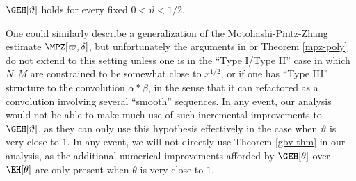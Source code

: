 \begin{theorem}\label{gbv-thm}\cite{motohashi}  $\GEH[\vartheta]$ holds for every fixed $0 < \vartheta < 1/2$.
\end{theorem}

One could similarly describe a generalization of the Motohashi-Pintz-Zhang estimate $\MPZ[\varpi,\delta]$, but unfortunately the arguments in \cite{zhang} or Theorem \ref{mpz-poly} do not extend to this setting unless one is in the ``Type I/Type II'' case in which $N,M$ are constrained to be somewhat close to $x^{1/2}$, or if one has ``Type III'' structure to the convolution $\alpha \ast \beta$, in the sense that it can refactored as a convolution involving several ``smooth'' sequences.  In any event, our analysis would not be able to make much use of such incremental improvements to $\GEH[\vartheta]$, as they can only use this hypothesis effectively in the case when $\vartheta$ is very close to $1$.  In any event, we will not directly use Theorem \ref{gbv-thm} in our analysis, as the additional numerical improvements afforded by $\GEH[\theta]$ over $\EH[\theta]$ are only present when $\theta$ is very close to $1$.




